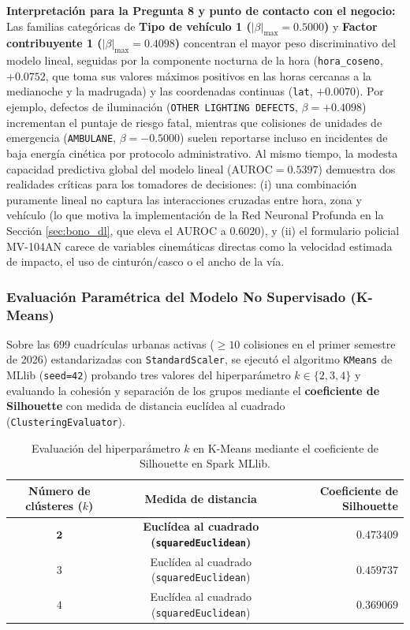 \documentclass[11pt,a4paper]{article}
\begin{document}
\noindent \textbf{Interpretación para la Pregunta 8 y punto de contacto con el negocio:}
Las familias categóricas de \textbf{Tipo de vehículo 1 ($|\beta|_{\max} = 0.5000$)} y \textbf{Factor contribuyente 1 ($|\beta|_{\max} = 0.4098$)} concentran el mayor peso discriminativo del modelo lineal, seguidas por la componente nocturna de la hora (\texttt{hora\_coseno}, $+0.0752$, que toma sus valores máximos positivos en las horas cercanas a la medianoche y la madrugada) y las coordenadas continuas (\texttt{lat}, $+0.0070$). Por ejemplo, defectos de iluminación (\texttt{OTHER LIGHTING DEFECTS}, $\beta = +0.4098$) incrementan el puntaje de riesgo fatal, mientras que colisiones de unidades de emergencia (\texttt{AMBULANE}, $\beta = -0.5000$) suelen reportarse incluso en incidentes de baja energía cinética por protocolo administrativo. Al mismo tiempo, la modesta capacidad predictiva global del modelo lineal ($\text{AUROC} = 0.5397$) demuestra dos realidades críticas para los tomadores de decisiones: (i) una combinación puramente lineal no captura las interacciones cruzadas entre hora, zona y vehículo (lo que motiva la implementación de la Red Neuronal Profunda en la Sección \ref{sec:bono_dl}, que eleva el AUROC a $0.6020$), y (ii) el formulario policial MV-104AN carece de variables cinemáticas directas como la velocidad estimada de impacto, el uso de cinturón/casco o el ancho de la vía.

\subsubsection{Evaluación Paramétrica del Modelo No Supervisado (K-Means)}

Sobre las $699$ cuadrículas urbanas activas ($\ge 10$ colisiones en el primer semestre de 2026) estandarizadas con \texttt{StandardScaler}, se ejecutó el algoritmo \texttt{KMeans} de MLlib (\texttt{seed=42}) probando tres valores del hiperparámetro $k \in \{2, 3, 4\}$ y evaluando la cohesión y separación de los grupos mediante el \textbf{coeficiente de Silhouette} con medida de distancia euclídea al cuadrado (\texttt{ClusteringEvaluator}).

\begin{table}[H]
\centering
\small
\renewcommand{\arraystretch}{1.2}
\caption{Evaluación del hiperparámetro $k$ en K-Means mediante el coeficiente de Silhouette en Spark MLlib.}
\label{tab:kmeans_silhouette}
\begin{tabular}{c c r}
\toprule
\textbf{Número de clústeres ($k$)} & \textbf{Medida de distancia} & \textbf{Coeficiente de Silhouette} \\
\midrule
$\mathbf{2}$ & \textbf{Euclídea al cuadrado (\texttt{squaredEuclidean})} & $\mathbf{0.473409}$ \\
$3$ & Euclídea al cuadrado (\texttt{squaredEuclidean}) & $0.459737$ \\
$4$ & Euclídea al cuadrado (\texttt{squaredEuclidean}) & $0.369069$ \\
\bottomrule
\end{tabular}
\end{table}
\end{document}
